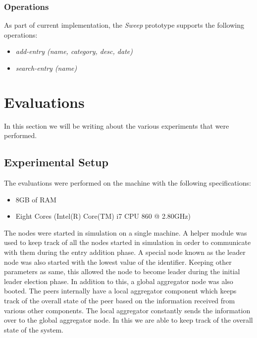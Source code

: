 \documentclass[12pt,a4paper,twoside,openright]{book}
\begin{document}
\subsection{Operations}
As part of current implementation, the \textit{Sweep} prototype supports the following operations:

\begin{itemize}

\item \textit{add-entry (name, category, desc, date)}
\item \textit{search-entry (name)}

\end{itemize}




\chapter{Evaluations}
\label{sec:eval}

In this section we will be writing about the various experiments that were performed.

\section{Experimental Setup}

The evaluations were performed on the machine with the following specifications:

\begin{itemize}

\item 8GB of RAM
\item Eight Cores (Intel(R) Core(TM) i7 CPU 860  @ 2.80GHz)
\end{itemize}

The nodes were started in simulation on a single machine. A helper module was used to keep track of all the nodes started in simulation in order to communicate with them during the entry addition phase. A special node known as the leader node was also started with the lowest value of the identifier. Keeping other parameters as same, this allowed the node to become leader during the initial leader election phase. In addition to this, a global aggregator node was also booted. The peers internally have a local aggregator component which keeps track of the overall state of the peer based on the information received from various other components. The local aggregator constantly sends the information over to the global aggregator node. In this we are able to keep track of the overall state of the system.
\end{document}
